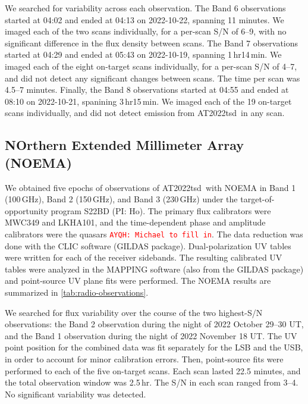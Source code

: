 \documentclass{nature_plusfigure}
\newcommand{\at}{AT2022tsd}
\newcommand{\ayqh}[1]{{\textcolor{red}{\texttt{AYQH: #1}}}}
\begin{document}
\begin{methods}
We searched for variability across each observation. The Band 6 observations started at 04:02 and ended at 04:13 on 2022-10-22, spanning 11 minutes. We imaged each of the two scans individually, for a per-scan S/N of 6--9, with no significant difference in the flux density between scans.
The Band 7 observations started at 04:29 and ended at 05:43 on 2022-10-19, spanning 1\,hr14\,min.
We imaged each of the eight on-target scans individually, for a per-scan S/N of 4--7, and did not detect any significant changes between scans. The time per scan was 4.5--7 minutes.
Finally, the Band 8 observations started at 04:55 and ended at 08:10 on 2022-10-21, spanining 3\,hr15\,min. We imaged each of the 19 on-target scans individually, and did not detect emission from \at\ in any scan.

\subsection{NOrthern Extended Millimeter Array (NOEMA)}
\label{Methods:NOEMA}

We obtained five epochs of observations of \at\ with NOEMA in Band 1 (100\,GHz), Band 2 (150\,GHz), and Band 3 (230\,GHz) under the target-of-opportunity program S22BD (PI: Ho). The primary flux calibrators were MWC349 and LKHA101, and the time-dependent phase and amplitude calibrators were the quasars \ayqh{Michael to fill in}. The data reduction was done with the CLIC software (GILDAS package\cite{GILDAS}). 
Dual-polarization UV tables were written for each of the receiver sidebands. The resulting calibrated UV tables were analyzed in the MAPPING software (also from the GILDAS package) and point-source UV plane fits were performed.
The NOEMA results are summarized in \ref{tab:radio-observations}.

We searched for flux variability over the course of the two highest-S/N observations: the Band 2 observation during the night of 2022 October 29--30 UT, and the Band 1 observation during the night of 2022 November 18 UT.
The UV point position for the combined data was fit separately for the LSB and the USB, in
order to account for minor calibration errors.
Then, point-source fits were performed to each of the five on-target scans. Each scan lasted 22.5 minutes, and the total observation window was 2.5\,hr. The S/N in each scan ranged from 3--4. No significant variability was detected.



\end{methods}
\end{document}
